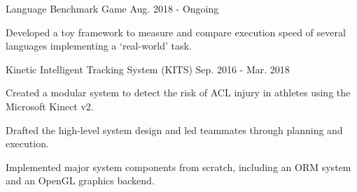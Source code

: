 

\begin{cventries}

  \vspace{1.5mm} %
  \cventry
    {Language Benchmark Game} %
    {} %
    {} %
    {Aug. 2018 - Ongoing} %
    {
      \begin{cvitems} %
        \item {Developed a toy framework to measure and compare execution speed of several languages implementing a `real-world' task.}
        \\
      \end{cvitems}
    }


  \vspace{1.5mm} %
  \cventry
    {Kinetic Intelligent Tracking System (KITS)} %
    {} %
    {} %
    {Sep. 2016 - Mar. 2018} %
    {
      \begin{cvitems} %
        \item {Created a modular system to detect the risk of ACL injury in athletes using the Microsoft Kinect v2.}
        \item {Drafted the high-level system design and led teammates through planning and execution.}
        \item {Implemented major system components from scratch, including an ORM system and an OpenGL graphics backend.}
        \\
      \end{cvitems}
    }


\end{cventries}
